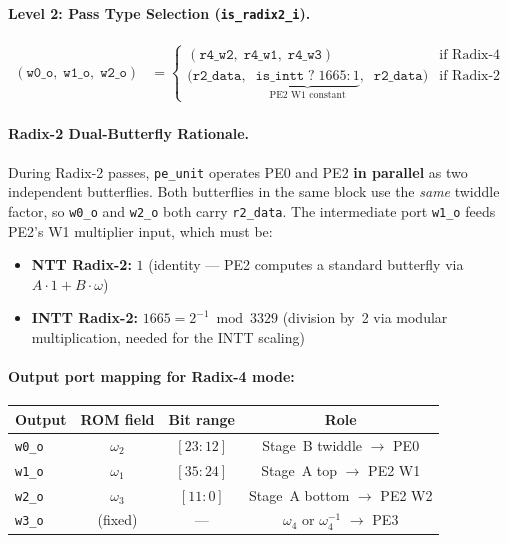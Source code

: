 \documentclass[11pt,a4paper]{article}
\newcommand{\sv}[1]{\texttt{#1}}
\newcommand{\port}[1]{\texttt{#1}}
\begin{document}
\paragraph{Level 2: Pass Type Selection (\port{is\_radix2\_i}).}
\begin{align}
  (\texttt{w0\_o},\; \texttt{w1\_o},\; \texttt{w2\_o}) &=
  \begin{cases}
    (\texttt{r4\_w2},\; \texttt{r4\_w1},\; \texttt{r4\_w3}) & \text{if Radix-4} \\[4pt]
    \bigl(\texttt{r2\_data},\;\; \underbrace{\texttt{is\_intt}\;?\;1665 : 1}_{\text{PE2 W1 constant}},\;\; \texttt{r2\_data}\bigr) & \text{if Radix-2}
  \end{cases}
\end{align}

\paragraph{Radix-2 Dual-Butterfly Rationale.}
During Radix-2 passes, \sv{pe\_unit} operates PE0 and PE2 \textbf{in parallel} as two independent butterflies. Both butterflies in the same block use the \emph{same} twiddle factor, so \port{w0\_o} and \port{w2\_o} both carry \texttt{r2\_data}. The intermediate port \port{w1\_o} feeds PE2's W1 multiplier input, which must be:
\begin{itemize}
  \item \textbf{NTT Radix-2:} $1$ (identity --- PE2 computes a standard butterfly via $A \cdot 1 + B \cdot \omega$)
  \item \textbf{INTT Radix-2:} $1665 = 2^{-1} \bmod 3329$ (division by~2 via modular multiplication, needed for the INTT scaling)
\end{itemize}

\paragraph{Output port mapping for Radix-4 mode:}

\begin{center}
\renewcommand{\arraystretch}{1.2}
\begin{tabular}{lccc}
\toprule
\textbf{Output} & \textbf{ROM field} & \textbf{Bit range} & \textbf{Role} \\
\midrule
\port{w0\_o} & $\omega_2$ & $[23:12]$ & Stage~B twiddle $\to$ PE0 \\
\port{w1\_o} & $\omega_1$ & $[35:24]$ & Stage~A top $\to$ PE2 W1 \\
\port{w2\_o} & $\omega_3$ & $[11:0]$  & Stage~A bottom $\to$ PE2 W2 \\
\port{w3\_o} & (fixed)    & ---       & $\omega_4$ or $\omega_4^{-1}$ $\to$ PE3 \\
\bottomrule
\end{tabular}
\end{center}
\end{document}
